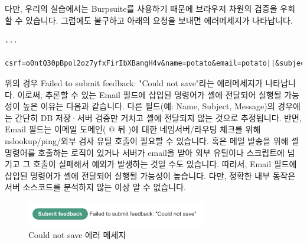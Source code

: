 \documentclass{article}
\begin{document}
\begin{description}
    다만, 우리의 실습에서는 Burpsuite를 사용하기 때문에 브라우저 차원의 검증을 우회할 수 있습니다.
    그럼에도 불구하고 아래의 요청을 보내면 에러메세지가 나타납니다.
    \begin{lstlisting}[label={lst:email-invalid},caption={Email 필드에 삽입된 명령어가 거부되는 요청}]
    ...
    csrf=o0ntQ30pBpol2oz7yfxFirIbXBangH4v&name=potato&email=potato||&subject=potato&message=%E3%84%B4%E3%85%81%E3%85%87%E3%84%B4%E3%85%81%E3%85%87
    \end{lstlisting}
    위의 경우 Failed to submit feedback: "Could not save"라는 에러메세지가 나타납니다.
    이로써, 추론할 수 있는 Email 필드에 삽입된 명령어가 셸에 전달되어 실행될 가능성이 높은 이유는 다음과 같습니다.
    다른 필드(예: Name, Subject, Message)의 경우에는 간단히 DB 저장·서버 검증만 거치고 셸에 전달되지 않는 것으로 추정됩니다.
    반면, Email 필드는 이메일 도메인( @ 뒤 )에 대한 네임서버/라우팅 체크를 위해 nslookup/ping/외부 검사 유틸 호출이 필요할 수 있습니다.
    혹은 메일 발송을 위해 셸 명령어를 호출하는 로직이 있거나 서버가 email을 받아 외부 유틸이나 스크립트에 넘기고 그 호출이 실패해서 예외가 발생하는 것일 수도 있습니다.
    따라서, Email 필드에 삽입된 명령어가 셸에 전달되어 실행될 가능성이 높습니다. 다만, 정확한 내부 동작은 서버 소스코드를 분석하지 않는 이상 알 수 없습니다.

      \begin{figure}[htbp]
      \centering
      \includegraphics[width=0.7\textwidth]{../figure/figure5.png}
      \caption{Could not save 에러 메세지}
      \label{fig:could-not-save}
      \end{figure}

\end{description}

\newpage
\end{document}

